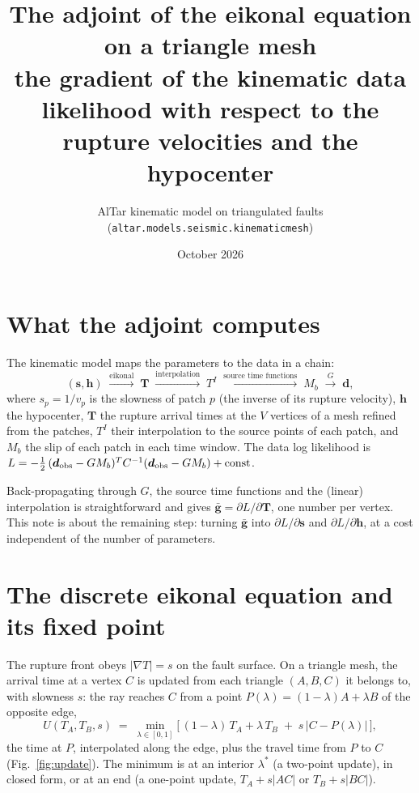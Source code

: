 \documentclass[11pt]{article}
\title{The adjoint of the eikonal equation on a triangle mesh\\[2pt]
\large the gradient of the kinematic data likelihood with respect to the rupture velocities and the hypocenter}
\author{AlTar kinematic model on triangulated faults (\texttt{altar.models.seismic.kinematicmesh})}
\date{October 2026}
\newcommand{\T}{\bm{T}}
\newcommand{\s}{\bm{s}}
\newcommand{\h}{\bm{h}}
\begin{document}
\maketitle

\section{What the adjoint computes}

The kinematic model maps the parameters to the data in a chain:
\[
(\s, \h) \;\xrightarrow{\text{eikonal}}\; \T \;\xrightarrow{\text{interpolation}}\; T^I
\;\xrightarrow{\text{source time functions}}\; M_b \;\xrightarrow{G}\; \bm{d},
\]
where $s_p = 1/v_p$ is the slowness of patch $p$ (the inverse of its rupture velocity), $\h$
the hypocenter, $\T$ the rupture arrival times at the $V$ vertices of a mesh refined from the
patches, $T^I$ their interpolation to the source points of each patch, and $M_b$ the slip of each
patch in each time window. The data log likelihood is
$L = -\tfrac12\,(\bm{d}_{\rm obs} - G M_b)^{T} C^{-1} (\bm{d}_{\rm obs} - G M_b) + \text{const}$.

Back-propagating through $G$, the source time functions and the (linear) interpolation is
straightforward and gives $\bar{\bm g} = \partial L / \partial \T$, one number per vertex. This note is
about the remaining step: turning $\bar{\bm g}$ into $\partial L / \partial \s$ and
$\partial L/\partial \h$, at a cost independent of the number of parameters.

\section{The discrete eikonal equation and its fixed point}

The rupture front obeys $|\nabla T| = s$ on the fault surface. On a triangle mesh, the arrival
time at a vertex $C$ is updated from each triangle $(A, B, C)$ it belongs to, with slowness $s$:
the ray reaches $C$ from a point $P(\lambda) = (1-\lambda) A + \lambda B$ of the opposite edge,
\begin{equation}
U(T_A, T_B, s) \;=\; \min_{\lambda\in[0,1]} \Big[\, (1-\lambda)\,T_A + \lambda\,T_B
\;+\; s\,\big|C - P(\lambda)\big| \,\Big],
\label{eq:update}
\end{equation}
the time at $P$, interpolated along the edge, plus the travel time from $P$ to $C$
(Fig.~\ref{fig:update}). The minimum is at an interior $\lambda^\ast$ (a two-point update), in
closed form, or at an end (a one-point update, $T_A + s|AC|$ or $T_B + s|BC|$).
\end{document}
